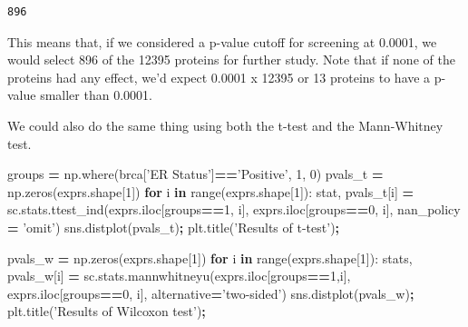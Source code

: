 \documentclass[
  letterpaper,
]{scrbook}
\newenvironment{Shaded}{\begin{snugshade}}{\end{snugshade}}
\newcommand{\BuiltInTok}[1]{#1}
\newcommand{\ControlFlowTok}[1]{\textcolor[rgb]{0.13,0.29,0.53}{\textbf{#1}}}
\newcommand{\DecValTok}[1]{\textcolor[rgb]{0.00,0.00,0.81}{#1}}
\newcommand{\KeywordTok}[1]{\textcolor[rgb]{0.13,0.29,0.53}{\textbf{#1}}}
\newcommand{\NormalTok}[1]{#1}
\newcommand{\OperatorTok}[1]{\textcolor[rgb]{0.81,0.36,0.00}{\textbf{#1}}}
\newcommand{\StringTok}[1]{\textcolor[rgb]{0.31,0.60,0.02}{#1}}
\begin{document}
\begin{verbatim}
896
\end{verbatim}

This means that, if we considered a p-value cutoff for screening at 0.0001, we would select 896 of the 12395 proteins for further study. Note that if none of the proteins had any effect, we'd expect 0.0001 x 12395 or 13 proteins to have a p-value smaller than 0.0001.

We could also do the same thing using both the t-test and the Mann-Whitney test.

\begin{Shaded}
\begin{Highlighting}[]
\NormalTok{groups }\OperatorTok{=}\NormalTok{ np.where(brca[}\StringTok{'ER Status'}\NormalTok{]}\OperatorTok{==}\StringTok{'Positive'}\NormalTok{, }\DecValTok{1}\NormalTok{, }\DecValTok{0}\NormalTok{)}
\NormalTok{pvals_t }\OperatorTok{=}\NormalTok{ np.zeros(exprs.shape[}\DecValTok{1}\NormalTok{])}
\ControlFlowTok{for}\NormalTok{ i }\KeywordTok{in} \BuiltInTok{range}\NormalTok{(exprs.shape[}\DecValTok{1}\NormalTok{]):}
\NormalTok{    stat, pvals_t[i] }\OperatorTok{=}\NormalTok{ sc.stats.ttest_ind(exprs.iloc[groups}\OperatorTok{==}\DecValTok{1}\NormalTok{, i],}
\NormalTok{                              exprs.iloc[groups}\OperatorTok{==}\DecValTok{0}\NormalTok{, i],}
\NormalTok{                              nan_policy }\OperatorTok{=} \StringTok{'omit'}\NormalTok{)}
\NormalTok{sns.distplot(pvals_t)}\OperatorTok{;}
\NormalTok{plt.title(}\StringTok{'Results of t-test'}\NormalTok{)}\OperatorTok{;}
\end{Highlighting}
\end{Shaded}

\begin{Shaded}
\begin{Highlighting}[]
\NormalTok{pvals_w }\OperatorTok{=}\NormalTok{ np.zeros(exprs.shape[}\DecValTok{1}\NormalTok{])}
\ControlFlowTok{for}\NormalTok{ i }\KeywordTok{in} \BuiltInTok{range}\NormalTok{(exprs.shape[}\DecValTok{1}\NormalTok{]):}
\NormalTok{    stats, pvals_w[i] }\OperatorTok{=}\NormalTok{ sc.stats.mannwhitneyu(exprs.iloc[groups}\OperatorTok{==}\DecValTok{1}\NormalTok{,i], }
\NormalTok{                                            exprs.iloc[groups}\OperatorTok{==}\DecValTok{0}\NormalTok{, i],}
\NormalTok{                                             alternative}\OperatorTok{=}\StringTok{'two-sided'}\NormalTok{)}
\NormalTok{sns.distplot(pvals_w)}\OperatorTok{;}
\NormalTok{plt.title(}\StringTok{'Results of Wilcoxon test'}\NormalTok{)}\OperatorTok{;}
\end{Highlighting}
\end{Shaded}
\end{document}

